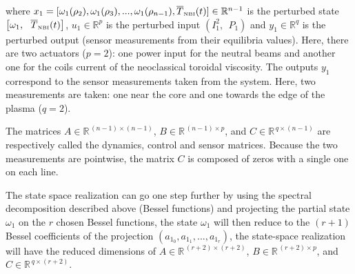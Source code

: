 \documentclass[12pt]{iopart}
\begin{document}
where $x_1 = [  \omega_1(\rho_2),  \omega_1(\rho_3), ...,   \omega_1(\rho_{n-1}), \overline{T}_\textrm{\tiny{NBI}}(t)     ] \in \mathbb{R}^{n-1}$ is the perturbed state $  \left[ \omega_1 , \ \ \overline{T}_\textrm{\tiny{NBI}}(t)  \right]$, $u_1 \in \mathbb{R}^p$ is the perturbed input $\left( I^2_1, \ \  P_1 \right)$ and $y_1 \in \mathbb{R}^q$ is the perturbed output (sensor measurements from their equilibria values).
Here, there are two actuators ($p=2$): one power input for the neutral beams and another one for the coils current of the neoclassical toroidal viscosity.
The outputs $y_1$ correspond to the sensor measurements taken from the system. Here, two measurements are taken: one near the core and one towards the edge of the plasma ($q=2$).

The matrices $A \in \mathbb{R}^{\, (n-1) \times (n-1)}$, $B \in \mathbb{R}^{\,(n-1) \times p}$, and $C \in \mathbb{R}^{\, q \times (n-1)}$ are respectively called the dynamics, control and sensor matrices.
Because the two measurements are pointwise, the matrix $C$ is composed of zeros with a single one on each line.

The state space realization can go one step further by using the spectral decomposition described above (Bessel functions) and projecting the partial state $ \omega_1$ on the $r$ chosen Bessel functions, the state $ \omega_1$ will then reduce to the $(r+1)$ Bessel coefficients of the projection $(a_{1_0}, a_{1_1}, ..., a_{1_r})$, the state-space realization will have the reduced dimensions of $A \in \mathbb{R}^{\, (r+2) \times (r+2)}$, $B \in \mathbb{R}^{\,(r+2) \times p}$, and $C \in \mathbb{R}^{\, q \times (r+2)}$.
\end{document}
